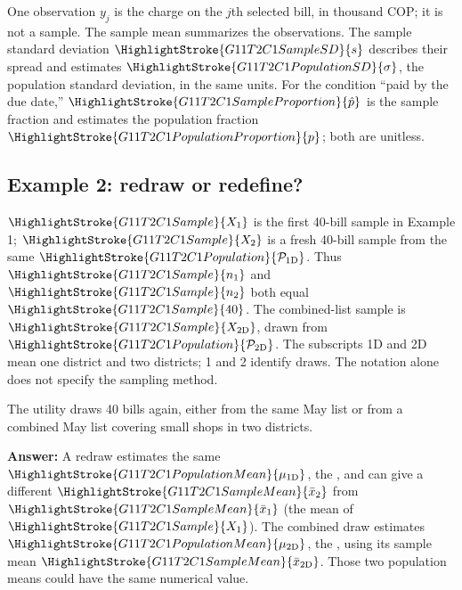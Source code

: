 	One observation $y_j$ is the charge on the $j$th selected bill, in thousand COP; it is not a sample. The sample mean summarizes the observations. The sample standard deviation $\HighlightStroke{G11T2C1SampleSD}{s}$ describes their spread and estimates $\HighlightStroke{G11T2C1PopulationSD}{\sigma}$, the population standard deviation, in the same units. For the condition ``paid by the due date,'' $\HighlightStroke{G11T2C1SampleProportion}{\hat{p}}$ is the sample fraction and estimates the population fraction $\HighlightStroke{G11T2C1PopulationProportion}{p}$; both are unitless.


	\subsection{Example 2: redraw or redefine?}
	\label{subsec:c1-quick-check}

    $\HighlightStroke{G11T2C1Sample}{X_1}$ is the first 40-bill sample in Example 1; $\HighlightStroke{G11T2C1Sample}{X_2}$ is a fresh 40-bill sample from the same $\HighlightStroke{G11T2C1Population}{\mathcal{P}_{\mathrm{1D}}}$. Thus $\HighlightStroke{G11T2C1Sample}{n_1}$ and $\HighlightStroke{G11T2C1Sample}{n_2}$ both equal $\HighlightStroke{G11T2C1Sample}{40}$. The combined-list sample is $\HighlightStroke{G11T2C1Sample}{X_{\mathrm{2D}}}$, drawn from $\HighlightStroke{G11T2C1Population}{\mathcal{P}_{\mathrm{2D}}}$. The subscripts 1D and 2D mean one district and two districts; 1 and 2 identify draws. The notation alone does not specify the sampling method.


	The utility draws 40 bills again, either from the same May list or from a combined May list covering small shops in two districts. 

	\label{sol:c1-quick-check}

	\textbf{Answer:} A redraw estimates the same $\HighlightStroke{G11T2C1PopulationMean}{\mu_{\mathrm{1D}}}$, the  , and can give a different $\HighlightStroke{G11T2C1SampleMean}{\bar{x}_{2}}$ from $\HighlightStroke{G11T2C1SampleMean}{\bar{x}_{1}}$ (the mean of $\HighlightStroke{G11T2C1Sample}{X_1}$). The combined draw estimates $\HighlightStroke{G11T2C1PopulationMean}{\mu_{\mathrm{2D}}}$, the  , using its sample mean $\HighlightStroke{G11T2C1SampleMean}{\bar{x}_{\mathrm{2D}}}$. Those two population means could have the same numerical value.

